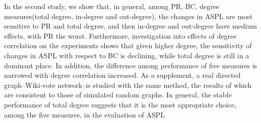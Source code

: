 \documentclass{article}
\begin{document}
 \par In the second study, we show that, in general, among PR, BC, degree measures(total degree, in-degree and out-degree), the changes in ASPL are most sensitive to PR and total degree, and then in-degree and out-degree have medium effects, with PR the worst. Furthermore, investigation into effects of degree correlation on the experiments shows that given higher degree, the sensitivity of changes in ASPL with respect to BC is declining, while total degree is still in a dominant place. In addition, the difference among performance of five measures is narrowed with degree correlation increased. As a supplement, a real directed graph--Wiki-vote network--is studied with the same method, the results of which are consistent to those of simulated random graphs. In general, the stable performance of total degree suggests that it is the most appropriate choice, among the five measures, in the evaluation of ASPL
\end{document}
